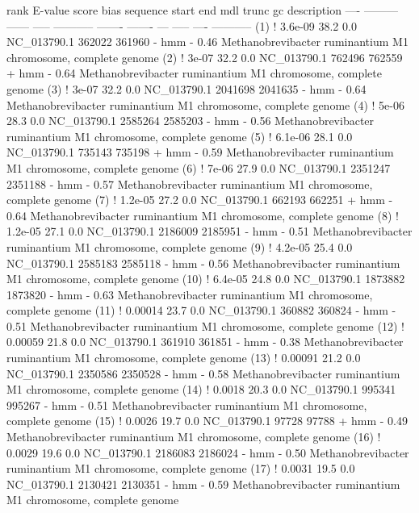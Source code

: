 \begin{sreoutput}
 rank     E-value  score  bias  sequence      start     end   mdl trunc   gc  description
 ----   --------- ------ -----  ----------- ------- -------   --- ----- ----  -----------
  (1) !   3.6e-09   38.2   0.0  NC_013790.1  362022  361960 - hmm     - 0.46  Methanobrevibacter ruminantium M1 chromosome, complete genome
  (2) !     3e-07   32.2   0.0  NC_013790.1  762496  762559 + hmm     - 0.64  Methanobrevibacter ruminantium M1 chromosome, complete genome
  (3) !     3e-07   32.2   0.0  NC_013790.1 2041698 2041635 - hmm     - 0.64  Methanobrevibacter ruminantium M1 chromosome, complete genome
  (4) !     5e-06   28.3   0.0  NC_013790.1 2585264 2585203 - hmm     - 0.56  Methanobrevibacter ruminantium M1 chromosome, complete genome
  (5) !   6.1e-06   28.1   0.0  NC_013790.1  735143  735198 + hmm     - 0.59  Methanobrevibacter ruminantium M1 chromosome, complete genome
  (6) !     7e-06   27.9   0.0  NC_013790.1 2351247 2351188 - hmm     - 0.57  Methanobrevibacter ruminantium M1 chromosome, complete genome
  (7) !   1.2e-05   27.2   0.0  NC_013790.1  662193  662251 + hmm     - 0.64  Methanobrevibacter ruminantium M1 chromosome, complete genome
  (8) !   1.2e-05   27.1   0.0  NC_013790.1 2186009 2185951 - hmm     - 0.51  Methanobrevibacter ruminantium M1 chromosome, complete genome
  (9) !   4.2e-05   25.4   0.0  NC_013790.1 2585183 2585118 - hmm     - 0.56  Methanobrevibacter ruminantium M1 chromosome, complete genome
 (10) !   6.4e-05   24.8   0.0  NC_013790.1 1873882 1873820 - hmm     - 0.63  Methanobrevibacter ruminantium M1 chromosome, complete genome
 (11) !   0.00014   23.7   0.0  NC_013790.1  360882  360824 - hmm     - 0.51  Methanobrevibacter ruminantium M1 chromosome, complete genome
 (12) !   0.00059   21.8   0.0  NC_013790.1  361910  361851 - hmm     - 0.38  Methanobrevibacter ruminantium M1 chromosome, complete genome
 (13) !   0.00091   21.2   0.0  NC_013790.1 2350586 2350528 - hmm     - 0.58  Methanobrevibacter ruminantium M1 chromosome, complete genome
 (14) !    0.0018   20.3   0.0  NC_013790.1  995341  995267 - hmm     - 0.51  Methanobrevibacter ruminantium M1 chromosome, complete genome
 (15) !    0.0026   19.7   0.0  NC_013790.1   97728   97788 + hmm     - 0.49  Methanobrevibacter ruminantium M1 chromosome, complete genome
 (16) !    0.0029   19.6   0.0  NC_013790.1 2186083 2186024 - hmm     - 0.50  Methanobrevibacter ruminantium M1 chromosome, complete genome
 (17) !    0.0031   19.5   0.0  NC_013790.1 2130421 2130351 - hmm     - 0.59  Methanobrevibacter ruminantium M1 chromosome, complete genome

\end{sreoutput}
